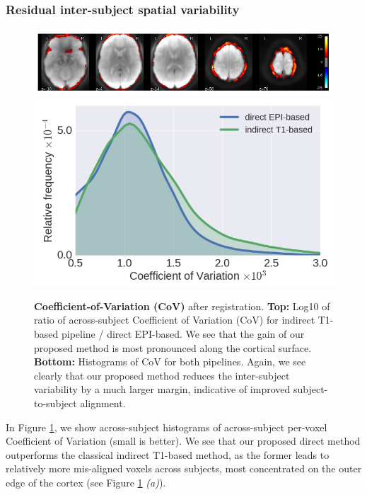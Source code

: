 \subsubsection{Residual inter-subject spatial variability}
\begin{figure}[!htb]
\includegraphics[width=1\linewidth]{figures/cov1.png}
\includegraphics[width=1\linewidth]{figures/cov2.png}
\caption{\textbf{Coefficient-of-Variation (CoV)} after registration. \textbf{Top:} Log10 of ratio of across-subject Coefficient of Variation (CoV) for indirect T1-based pipeline / direct EPI-based. We see that the gain of our proposed method is most pronounced along the cortical surface.
\textbf{Bottom:} Histograms of CoV  for both
  pipelines. Again, we see clearly that our proposed method reduces the inter-subject variability by a much larger margin, indicative of improved subject-to-subject alignment.}
\label{fig:cv}
\end{figure}

In Figure \ref{fig:cv}, we show across-subject histograms of
across-subject per-voxel Coefficient of Variation (small is better).
We see that our proposed direct method outperforms the classical indirect T1-based method, as the former leads to relatively more mis-aligned voxels across subjects, most concentrated on the outer edge of the cortex (see Figure \ref{fig:cv} \textit{(a)}).

